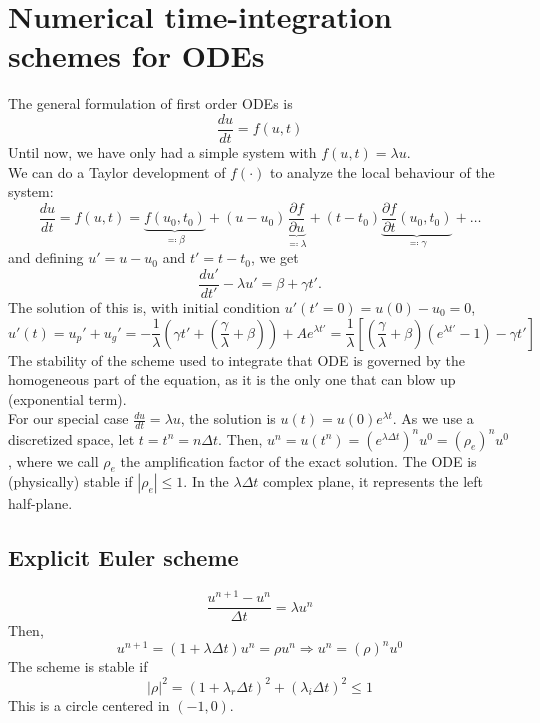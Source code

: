 \documentclass[12pt, openany]{report}
\theoremstyle{definition}
\begin{document}
\chapter{Numerical time-integration schemes for ODEs}
The general formulation of first order ODEs is 
\begin{equation}
	\frac{du}{dt} = f(u,t)
\end{equation}
Until now, we have only had a simple system with $f(u,t) = \lambda u$. \\
We can do a Taylor development of $f(\cdot)$ to analyze the local behaviour of the system:
\begin{equation}
	\frac{du}{dt} = f(u,t) = \underbrace{f(u_0,t_0)}_{\eqqcolon\beta} + (u-u_0)\underbrace{\frac{\partial f}{\partial u}}_{\eqqcolon \lambda} + (t-t_0) \underbrace{\frac{\partial f}{\partial t}(u_0,t_0)}_{\eqqcolon \gamma} + \dots 
\end{equation}
and defining $u' = u-u_0$ and $t'=t-t_0$, we get 
\begin{equation}
	\frac{du'}{dt'} -\lambda u' = \beta+\gamma t'.
\end{equation}
The solution of this is, with initial condition $u'(t'=0)=u(0)-u_0 = 0$, 
\begin{equation}
	u'(t) = u_p' + u_g' = -\frac{1}{\lambda}\left(\gamma t' + \left(\frac{\gamma}{\lambda}+ \beta\right)\right) + A e^{\lambda t'} = \frac{1}{\lambda}\left[\left(\frac{\gamma}{\lambda} + \beta\right)\left(e^{\lambda t'} -1\right) - \gamma t'\right]
\end{equation}
The stability of the scheme used to integrate that ODE is governed by the homogeneous part of the equation, as it is the only one that can blow up (exponential term). \\

For our special case $\frac{du}{dt} = \lambda u$, the solution is $u(t) = u(0)e^{\lambda t}$. As we use a discretized space, let $t=t^n = n\Delta t$. Then, $u^n = u(t^n) = (e^{\lambda \Delta t})^n u^0 = (\rho_e)^nu^0$, where we call $\rho_e$ the amplification factor of the exact solution. The ODE is (physically) stable if $|\rho_e| \le 1$. In the $\lambda \Delta t$ complex plane, it represents the left half-plane. 
\section{Explicit Euler scheme}
\begin{equation}
	\frac{u^{n+1}-u^n}{\Delta t} = \lambda u^n
\end{equation}
Then, 
\begin{equation}
	u^{n+1} = (1+\lambda \Delta t)u^n = \rho u^n \Longrightarrow u^n = (\rho)^n u^0
\end{equation}
The scheme is stable if 
\begin{equation}
	|\rho|^2 = (1+\lambda_r \Delta t)^2 + (\lambda_i\Delta t)^2 \le 1
\end{equation}
This is a circle centered in $(-1,0)$. \\
\end{document}
